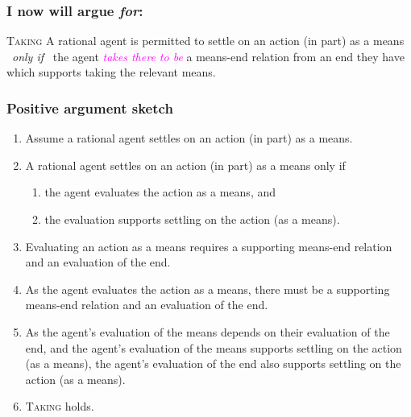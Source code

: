 \documentclass[noamssymb,
graphics,
]{beamer} %
\newcommand{\schemaName}[1]{\textsc{#1}}
\begin{document}
\begin{frame}
  \frametitle{I now will argue \emph{for}:}

  \begin{block}{\schemaName{Taking}}
    A rational agent is permitted to settle on an action (in part) as a means
    \newline
    \mbox{ }\hfill\emph{only if}\hfill\mbox{ }
    \newline
    the agent \textcolor{fuchsia}{\emph{takes there to be}} a means-end relation from an end they have which supports taking the relevant means.
  \end{block}
\end{frame}

\begin{frame}
  \frametitle{Positive argument sketch}
  \begin{enumerate}
  \item Assume a rational agent settles on an action (in part) as a means.
  \item A rational agent settles on an action (in part) as a means only if
    \begin{enumerate}
    \item the agent evaluates the action as a means, and
    \item the evaluation supports settling on the action (as a means).
    \end{enumerate}
  \item Evaluating an action as a means requires a supporting means-end relation and an evaluation of the end.
  \item As the agent evaluates the action as a means, there must be a supporting means-end relation and an evaluation of the end.
  \item As the agent's evaluation of the means depends on their evaluation of the end, and the agent's evaluation of the means supports settling on the action (as a means), the agent's evaluation of the end also supports settling on the action (as a means).
  \item \schemaName{Taking} holds.
  \end{enumerate}
\end{frame}
\end{document}
